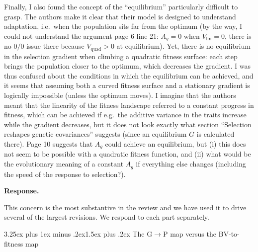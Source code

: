 \documentclass[11pt,a4paper]{article}
\makeatletter
\newcommand{\response}{%
  \par\medskip\noindent\textbf{\color{ResponseColor}Response.}\quad\ignorespaces
}
\renewcommand{\subsubsection}{\@startsection{subsubsection}{3}{0pt}%
  {3.25ex plus 1ex minus .2ex}{1.5ex plus .2ex}%
  {\normalsize\bfseries\itshape}}
\newcommand{\Vlin}{\ensuremath{V_{\mathrm{lin}}}\xspace}
\newcommand{\Vquad}{\ensuremath{V_{\mathrm{quad}}}\xspace}
\makeatother
\begin{document}
\begin{revquote}
Finally, I also found the concept of the ``equilibrium'' particularly difficult to grasp. The authors make it clear that their model is designed to understand adaptation, i.e.\ when the population sits far from the optimum (by the way, I could not understand the argument page 6 line 21: $A_g=0$ when $\Vlin=0$, there is no $0/0$ issue there because $\Vquad > 0$ at equilibrium). Yet, there is no equilibrium in the selection gradient when climbing a quadratic fitness surface: each step brings the population closer to the optimum, which decreases the gradient. I was thus confused about the conditions in which the equilibrium can be achieved, and it seems that assuming both a curved fitness surface and a stationary gradient is logically impossible (unless the optimum moves). I imagine that the authors meant that the linearity of the fitness landscape referred to a constant progress in fitness, which can be achieved if e.g.\ the additive variance in the traits increase while the gradient decreases, but it does not look exactly what section ``Selection reshapes genetic covariances'' suggests (since an equilibrium $G$ is calculated there). Page 10 suggests that $A_g$ could achieve an equilibrium, but (i) this does not seem to be possible with a quadratic fitness function, and (ii) what would be the evolutionary meaning of a constant $A_g$ if everything else changes (including the speed of the response to selection?).
\end{revquote}

\response
This concern is the most substantive in the review and we have used it to drive several of the largest revisions. We respond to each part separately.

\subsubsection{\texorpdfstring{The G$\to$P map versus the BV-to-fitness map}{The G->P map versus the BV-to-fitness map}}
\end{document}
